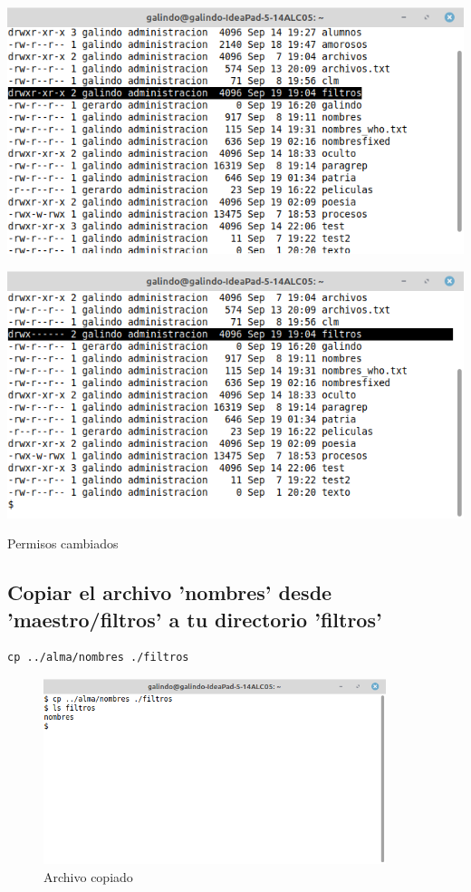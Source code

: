 \documentclass[11pt]{article}
\begin{document}
\begin{twoc}
\begin{center}
\includegraphics[width=.9\linewidth]{img/a2a.png}
\end{center}
\end{twoc}
\begin{twoc}
\begin{center}
\includegraphics[width=.9\linewidth]{img/a2b.png}
\end{center}
\end{twoc}

Permisos cambiados

\subsection{Copiar el archivo 'nombres' desde 'maestro/filtros' a tu directorio 'filtros'}
\label{sec:orgd281a81}
\begin{verbatim}
cp ../alma/nombres ./filtros
\end{verbatim}

\begin{figure}[htbp]
\centering
\includegraphics[width=10cm]{img/a3.png}
\caption{Archivo copiado}
\end{figure}
\end{document}
